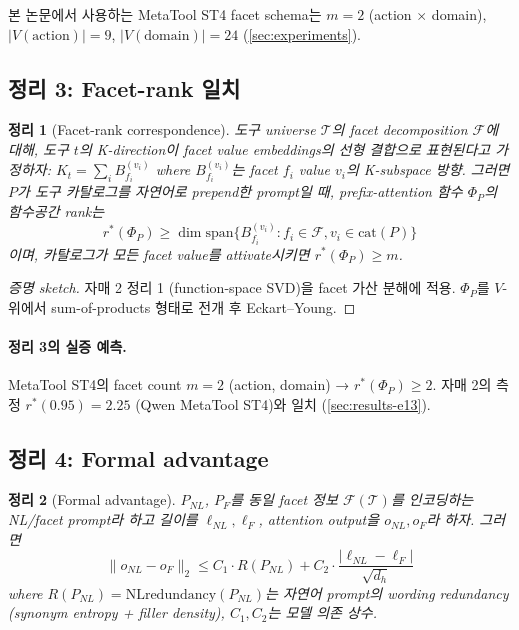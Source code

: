 \documentclass[11pt]{article}
\theoremstyle{plain}
\newtheorem{theorem}{정리}[section]
\theoremstyle{definition}
\theoremstyle{remark}
\newcommand{\dh}{d_{\!h}}
\newcommand{\Phip}{\Phi_P}
\begin{document}
본 논문에서 사용하는 MetaTool ST4 facet schema는 $m=2$ (action $\times$ domain), $|V(\mathrm{action})|=9$, $|V(\mathrm{domain})|=24$ (\cref{sec:experiments}).

\subsection{정리 3: Facet-rank 일치}

\begin{theorem}[Facet-rank correspondence]
\label{thm:facet-rank}
도구 universe $\mathcal{T}$의 facet decomposition $\mathcal{F}$에 대해, 도구 $t$의 K-direction이 facet value embeddings의 선형 결합으로 표현된다고 가정하자: $K_t = \sum_i B_{f_i}^{(v_i)}$ where $B_{f_i}^{(v_i)}$는 facet $f_i$ value $v_i$의 K-subspace 방향. 그러면 $P$가 도구 카탈로그를 자연어로 prepend한 prompt일 때, prefix-attention 함수 $\Phip$의 함수공간 rank는
\[
  r^*(\Phip) \ge \dim\mathrm{span}\{B_{f_i}^{(v_i)}: f_i \in \mathcal{F}, v_i \in \mathrm{cat}(P)\}
\]
이며, 카탈로그가 모든 facet value를 attivate시키면 $r^*(\Phip) \ge m$.
\end{theorem}

\begin{proof}[증명 sketch]
자매 2 정리 1 (function-space SVD)을 facet 가산 분해에 적용. $\Phip$를 $V$-위에서 sum-of-products 형태로 전개 후 Eckart--Young.
\end{proof}

\paragraph{정리 3의 실증 예측.}
MetaTool ST4의 facet count $m=2$ (action, domain) → $r^*(\Phip) \ge 2$. 자매 2의 측정 $r^*(0.95) = 2.25$ (Qwen MetaTool ST4)와 일치 (\cref{sec:results-e13}).

\subsection{정리 4: Formal advantage}

\begin{theorem}[Formal advantage]
\label{thm:formal-advantage}
$P_{NL}$, $P_F$를 동일 facet 정보 $\mathcal{F}(\mathcal{T})$를 인코딩하는 NL/facet prompt라 하고 길이를 $\ell_{NL}, \ell_F$, attention output을 $o_{NL}, o_F$라 하자. 그러면
\[
  \|o_{NL} - o_F\|_2 \le C_1 \cdot R(P_{NL}) + C_2 \cdot \frac{|\ell_{NL} - \ell_F|}{\sqrt{\dh}}
\]
where $R(P_{NL}) = \mathrm{NLredundancy}(P_{NL})$는 자연어 prompt의 wording redundancy (synonym entropy + filler density), $C_1, C_2$는 모델 의존 상수.
\end{theorem}
\end{document}
